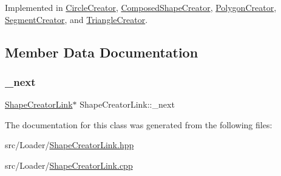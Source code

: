 Implemented in \hyperlink{class_circle_creator_ae77dd120e2521fdfb2e002228a1f0c25}{Circle\+Creator}, \hyperlink{class_composed_shape_creator_a5a1ebce5d0d7509923e70d507dc57ff2}{Composed\+Shape\+Creator}, \hyperlink{class_polygon_creator_ad7a34580d4291a50fe189c912c7b32a0}{Polygon\+Creator}, \hyperlink{class_segment_creator_ab19a7665cba20a6e0b44c57b3cb4ce77}{Segment\+Creator}, and \hyperlink{class_triangle_creator_a8698d657d98a7be93aeaf86b2434bbb3}{Triangle\+Creator}.



\subsection{Member Data Documentation}
\hypertarget{class_shape_creator_link_a53714771bfbce43504eac24c4acf7e6f}{}\label{class_shape_creator_link_a53714771bfbce43504eac24c4acf7e6f} 
\subsubsection{\texorpdfstring{\+\_\+next}{\_next}}
{\footnotesize\ttfamily \hyperlink{class_shape_creator_link}{Shape\+Creator\+Link}$\ast$ Shape\+Creator\+Link\+::\+\_\+next\hspace{0.3cm}{\ttfamily [protected]}}



The documentation for this class was generated from the following files\+:\begin{DoxyCompactItemize}
\item 
src/\+Loader/\hyperlink{_shape_creator_link_8hpp}{Shape\+Creator\+Link.\+hpp}\item 
src/\+Loader/\hyperlink{_shape_creator_link_8cpp}{Shape\+Creator\+Link.\+cpp}\end{DoxyCompactItemize}
